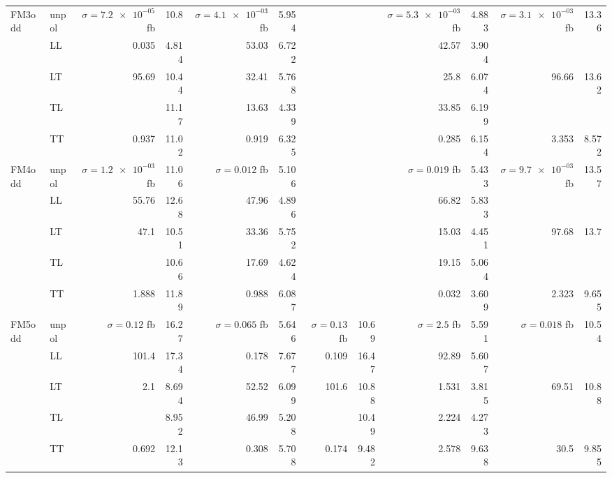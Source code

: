\begin{table}[h]
{\begin{tabular}{llrrrrrrrrrr}
\midrule
\multirow{5}{*}{FM3odd}
 & unpol & $\sigma = \num{7.2e-05}$ fb & \num{10.8} & $\sigma = \num{4.1e-03}$ fb & \num{5.954} &  &  & $\sigma = \num{5.3e-03}$ fb & \num{4.883} & $\sigma = \num{3.1e-03}$ fb & \num{13.36} \\
 & LL & \num{0.035} & \num{4.814} & \num{53.03} & \num{6.722} &  &  & \num{42.57} & \num{3.904} &  &  \\
 & LT & \num{95.69} & \num{10.44} & \num{32.41} & \num{5.768} &  &  & \num{25.8} & \num{6.074} & \num{96.66} & \num{13.62} \\
 & TL &  & \num{11.17} & \num{13.63} & \num{4.339} &  &  & \num{33.85} & \num{6.199} &  &  \\
 & TT & \num{0.937} & \num{11.02} & \num{0.919} & \num{6.325} &  &  & \num{0.285} & \num{6.154} & \num{3.353} & \num{8.572} \\
\midrule
\multirow{5}{*}{FM4odd}
 & unpol & $\sigma = \num{1.2e-03}$ fb & \num{11.06} & $\sigma = \num{0.012}$ fb & \num{5.106} &  &  & $\sigma = \num{0.019}$ fb & \num{5.433} & $\sigma = \num{9.7e-03}$ fb & \num{13.57} \\
 & LL & \num{55.76} & \num{12.68} & \num{47.96} & \num{4.896} &  &  & \num{66.82} & \num{5.833} &  &  \\
 & LT & \num{47.1} & \num{10.51} & \num{33.36} & \num{5.752} &  &  & \num{15.03} & \num{4.451} & \num{97.68} & \num{13.7} \\
 & TL &  & \num{10.66} & \num{17.69} & \num{4.624} &  &  & \num{19.15} & \num{5.064} &  &  \\
 & TT & \num{1.888} & \num{11.89} & \num{0.988} & \num{6.087} &  &  & \num{0.032} & \num{3.609} & \num{2.323} & \num{9.655} \\
\midrule
\multirow{5}{*}{FM5odd}
 & unpol & $\sigma = \num{0.12}$ fb & \num{16.27} & $\sigma = \num{0.065}$ fb & \num{5.646} & $\sigma = \num{0.13}$ fb & \num{10.69} & $\sigma = \num{2.5}$ fb & \num{5.591} & $\sigma = \num{0.018}$ fb & \num{10.54} \\
 & LL & \num{101.4} & \num{17.34} & \num{0.178} & \num{7.677} & \num{0.109} & \num{16.47} & \num{92.89} & \num{5.607} &  &  \\
 & LT & \num{2.1} & \num{8.694} & \num{52.52} & \num{6.099} & \num{101.6} & \num{10.88} & \num{1.531} & \num{3.815} & \num{69.51} & \num{10.88} \\
 & TL &  & \num{8.952} & \num{46.99} & \num{5.208} &  & \num{10.49} & \num{2.224} & \num{4.273} &  &  \\
 & TT & \num{0.692} & \num{12.13} & \num{0.308} & \num{5.708} & \num{0.174} & \num{9.482} & \num{2.578} & \num{9.638} & \num{30.5} & \num{9.855} \\

\end{tabular}}
\end{table}
